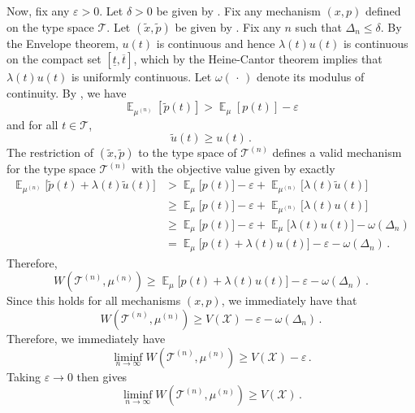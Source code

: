 \documentclass[12pt,letterpaper]{article}
\newenvironment{original}{\color{black}\noindent}{}
\theoremstyle{plain}
\theoremstyle{definition}
\theoremstyle{remark}
\DeclareMathOperator{\E}{\mathds{E}}
\renewcommand{\1}{\mathds{1}}
\newcommand{\X}{\mathcal{X}}
\theoremstyle{definition}
\begin{document}
\begin{original}
Now, fix any $\varepsilon > 0$. Let $\delta > 0$ be given by .  Fix any mechanism $(x, p)$ defined on the type space $\mathcal{T}$. Let $(\tilde{x}, \tilde{p})$ be given by . Fix any $n$ such that $\Delta_n \leq \delta$. By the Envelope theorem, $u(t)$ is continuous and hence $\lambda(t)u(t)$ is continuous on the compact set $[\underline{t}, \overline{t}]$, which by the Heine-Cantor theorem implies that $\lambda(t)u(t)$ is uniformly continuous. Let $\omega(\,\cdot\,)$ denote its modulus of continuity. By , we have
\[\E_{\mu^{(n)}}[\tilde{p}(t)] > \E_{\mu}[p(t)] - \varepsilon\]
and for all $t \in \mathcal{T}$,
\[\tilde{u}(t) \geq u(t)\,.\]
The restriction of $(\tilde{x}, \tilde{p})$ to the type space of $\mathcal{T}^{(n)}$ defines a valid mechanism for the type space $\mathcal{T}^{(n)}$ with the objective value given by exactly
\begin{align*}
    \E_{\mu^{(n)}}\Big[\tilde{p}(t) + \lambda(t) \tilde{u}(t) \Big] &>  \E_{\mu}\Big[p(t)\Big] - \varepsilon + \E_{\mu^{(n)}}\Big[\lambda(t) \tilde{u}(t) \Big]\\
    &\geq  \E_{\mu}\Big[p(t)\Big] - \varepsilon + \E_{\mu^{(n)}}\Big[\lambda(t) u(t) \Big]\\
    &\geq  \E_{\mu}\Big[p(t)\Big] - \varepsilon + \E_{\mu}\Big[\lambda(t) u(t) \Big] - \omega(\Delta_n)\\
    & =  \E_{\mu}\Big[p(t) + \lambda(t) u(t) \Big] - \varepsilon - \omega(\Delta_n)\,.
\end{align*}
Therefore,
\[W(\mathcal{T}^{(n)}, \mu^{(n)}) \geq  \E_{\mu}\Big[p(t) + \lambda(t) u(t) \Big] - \varepsilon - \omega(\Delta_n)\,.\]
Since this holds for all mechanisms $(x, p)$, we immediately have that
\[W(\mathcal{T}^{(n)}, \mu^{(n)}) \geq  V(\X) - \varepsilon - \omega(\Delta_n)\,.\]
Therefore, we immediately have
\[\liminf_{n\rightarrow\infty} W(\mathcal{T}^{(n)}, \mu^{(n)}) \geq  V(\X) - \varepsilon \,.\]
Taking $\varepsilon \rightarrow 0$ then gives
\[\liminf_{n\rightarrow\infty} W(\mathcal{T}^{(n)}, \mu^{(n)}) \geq  V(\X) \,.\]


\end{original}
\end{document}
